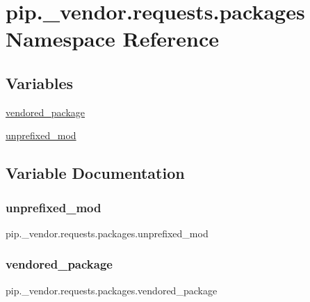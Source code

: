 \hypertarget{namespacepip_1_1__vendor_1_1requests_1_1packages}{}\section{pip.\+\_\+vendor.\+requests.\+packages Namespace Reference}
\label{namespacepip_1_1__vendor_1_1requests_1_1packages}
\subsection*{Variables}
\begin{DoxyCompactItemize}
\item 
\hyperlink{namespacepip_1_1__vendor_1_1requests_1_1packages_ad5504c56f92b9ed9292c7602684443dc}{vendored\+\_\+package}
\item 
\hyperlink{namespacepip_1_1__vendor_1_1requests_1_1packages_a277980a16958d3242d9054b8d8dd416c}{unprefixed\+\_\+mod}
\end{DoxyCompactItemize}


\subsection{Variable Documentation}
\mbox{\label{namespacepip_1_1__vendor_1_1requests_1_1packages_a277980a16958d3242d9054b8d8dd416c}} 
\subsubsection{\texorpdfstring{unprefixed\+\_\+mod}{unprefixed\_mod}}
{\footnotesize\ttfamily pip.\+\_\+vendor.\+requests.\+packages.\+unprefixed\+\_\+mod}

\mbox{\label{namespacepip_1_1__vendor_1_1requests_1_1packages_ad5504c56f92b9ed9292c7602684443dc}} 
\subsubsection{\texorpdfstring{vendored\+\_\+package}{vendored\_package}}
{\footnotesize\ttfamily pip.\+\_\+vendor.\+requests.\+packages.\+vendored\+\_\+package}

